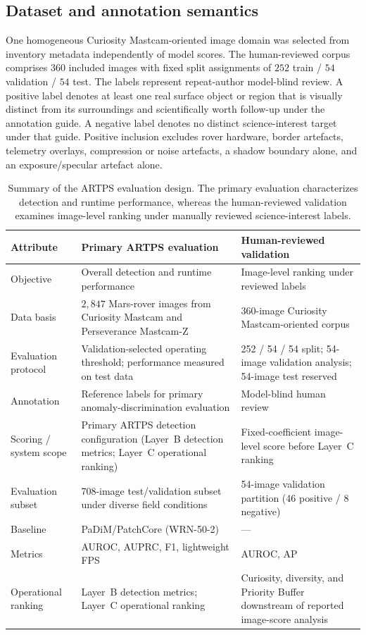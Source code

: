 \subsection{Dataset and annotation semantics}
One homogeneous Curiosity Mastcam-oriented image domain was selected from inventory metadata
independently of model scores.
The human-reviewed corpus comprises $360$ included images with fixed split assignments of
$252$ train / $54$ validation / $54$ test.
The labels represent repeat-author model-blind review.
A positive label denotes at least one real surface object or region that is visually distinct
from its surroundings and scientifically worth follow-up under the annotation guide.
A negative label denotes no distinct science-interest target under that guide.
Positive inclusion excludes rover hardware, border artefacts, telemetry overlays, compression
or noise artefacts, a shadow boundary alone, and an exposure/specular artefact alone.

\FloatBarrier
\begin{table}[t]
\centering
\small
\caption{Summary of the ARTPS evaluation design.
The primary evaluation characterizes detection and runtime performance, whereas the
human-reviewed validation examines image-level ranking under manually reviewed
science-interest labels.}
\label{tab:eval-tracks}
\begin{tabularx}{\textwidth}{@{}>{\raggedright\arraybackslash}p{2.55cm}XX@{}}
\toprule
Attribute & Primary ARTPS evaluation & Human-reviewed validation \\
\midrule
Objective & Overall detection and runtime performance
  & Image-level ranking under reviewed labels \\
Data basis & $2{,}847$ Mars-rover images from Curiosity Mastcam and Perseverance Mastcam-Z
  & 360-image Curiosity Mastcam-oriented corpus \\
Evaluation protocol & Validation-selected operating threshold; performance measured on test data
  & 252 / 54 / 54 split; 54-image validation analysis; 54-image test reserved \\
Annotation & Reference labels for primary anomaly-discrimination evaluation
  & Model-blind human review \\
Scoring / system scope & Primary ARTPS detection configuration (Layer~B detection metrics; Layer~C operational ranking)
  & Fixed-coefficient image-level score before Layer~C ranking \\
Evaluation subset & 708-image test/validation subset under diverse field conditions
  & 54-image validation partition (46 positive / 8 negative) \\
Baseline & PaDiM/PatchCore (WRN-50-2)
  & --- \\
Metrics & AUROC, AUPRC, F1, lightweight FPS
  & AUROC, AP \\
Operational ranking & Layer~B detection metrics; Layer~C operational ranking
  & Curiosity, diversity, and Priority Buffer downstream of reported image-score analysis \\
\bottomrule
\end{tabularx}
\end{table}

